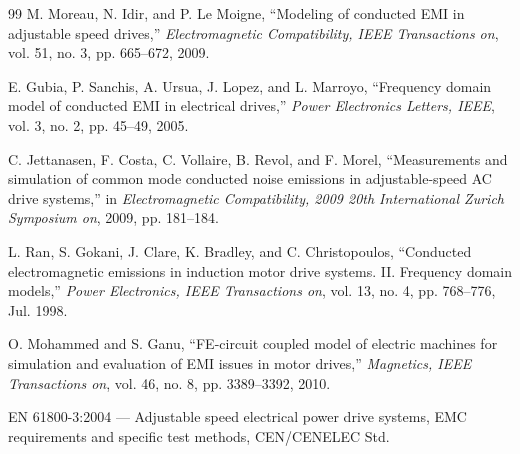 \begin{thebibliography}{99}
M. Moreau, N. Idir, and P. Le Moigne, ``Modeling of conducted EMI in adjustable speed drives,'' \textit{Electromagnetic Compatibility, IEEE Transactions on}, vol. 51, no. 3, pp. 665--672, 2009.

E. Gubia, P. Sanchis, A. Ursua, J. Lopez, and L. Marroyo, ``Frequency domain model of conducted EMI in electrical drives,'' \textit{Power Electronics Letters, IEEE}, vol. 3, no. 2, pp. 45--49, 2005.

C. Jettanasen, F. Costa, C. Vollaire, B. Revol, and F. Morel, ``Measurements and simulation of common mode conducted noise emissions in adjustable-speed AC drive systems,'' in \textit{Electromagnetic Compatibility, 2009 20th International Zurich Symposium on}, 2009, pp. 181--184.

L. Ran, S. Gokani, J. Clare, K. Bradley, and C. Christopoulos, ``Conducted electromagnetic emissions in induction motor drive systems. II. Frequency domain models,'' \textit{Power Electronics, IEEE Transactions on}, vol. 13, no. 4, pp. 768--776, Jul. 1998.

O. Mohammed and S. Ganu, ``FE-circuit coupled model of electric machines for simulation and evaluation of EMI issues in motor drives,'' \textit{Magnetics, IEEE Transactions on}, vol. 46, no. 8, pp. 3389--3392, 2010.

EN 61800-3:2004 --- Adjustable speed electrical power drive systems, EMC requirements and specific test methods, CEN/CENELEC Std.

\end{thebibliography}

